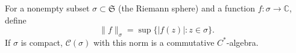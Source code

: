 For a nonempty subset $\sigma \subset \mathfrak{S}$ (the Riemann sphere) and a function $f: \sigma \to \mathbb{C}$, define
$$\|f\|_\sigma = \sup \{ |f(z)| : z \in \sigma \}.$$
If $\sigma$ is compact, $\mathcal{C}(\sigma)$ with this norm is a commutative $C^*$-algebra.
